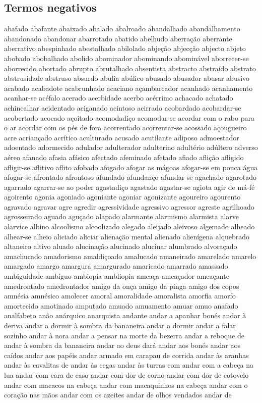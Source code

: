\subsection{Termos negativos}
abafado abafante abaixado abalado abalroado abandalhado abandalhamento abandonado abandonar abarrotado abatido abelhudo aberra\c{c}\~ao aberrante aberrativo abespinhado abestalhado abilolado abje\c{c}\~ao abjec\c{c}\~ao abjecto abjeto abobado abobalhado abolido abominador abominando abomin\'{a}vel aborrecer-se aborrecido abortado abrupto abrutalhado absentista abstracto abstra\'{i}do abstrato abstrusidade abstruso absurdo abulia ab\'{u}lico abusado abusador abusar abusivo acabado acabadote acabrunhado acaciano a\c{c}ambarcador acanhado acanhamento acanhar-se ac\'{e}falo acerado acerbidade acerbo ac\'{e}rrimo achacado achatado achincalhar acidentado aciganado acintoso acirrado acobardado acobardar-se acobertado acocado a\c{c}oitado acomodadi\c{c}o acomodar-se acordar com o rabo para o ar acordar com os p\'{e}s de fora acorrentado acorrentar-se acossado a\c{c}ougueiro acre acrian\c{c}ado acr\'{i}tico aculturado acusado acutilante adiposo admoestador adoentado adormecido adulador adulterador adulterino adult\'{e}rio ad\'{u}ltero adverso a\'{e}reo afanado afasia af\'{a}sico afectado afeminado afetado afiado afli\c{c}\~ao afligido afligir-se aflitivo aflito afobado afogado afogar as m\'{a}goas afogar-se em pouca \'{a}gua afogar-se afrontado afrontoso afundado afundan\c{c}o afundar-se agachado agarotado agarrado agarrar-se ao poder agastadi\c{c}o agastado agastar-se agiota agir de m\'{a}-f\'{e} agoirento agonia agoniado agoniante agoniar agonizante agoureiro agourento agravado agravar agre agredir agressividade agressivo agressor agreste agrilhoado agrosseirado aguado agu\c{c}ado alapado alarmante alarmismo alarmista alarve alarvice albino alcoolismo alcoolizado alegado aleijado aleivoso algemado alheado alhear-se alheio aliciado aliciar aliena\c{c}\~ao mental alienado alien\'{i}gena alquebrado altaneiro altivo aluado alucina\c{c}\~ao alucinado alucinar alumbrado alvora\c{c}ado amachucado amadorismo amaldi\c{c}oado amalucado amaneirado amarelado amarelo amargado amargo amargura amargurado amaricado amarrado amassado ambiguidade amb\'{i}guo ambiopia ambliopia amea\c{c}a amea\c{c}ador amea\c{c}ante amedrontado amedrontador amigo da on\c{c}a amigo da pinga amigo dos copos amn\'{e}sia amn\'{e}sico amolecer amoral amoralidade amoralista amorfia amorfo amortecido amotinado amputado amuado amuamento amuar amuo anafado analfabeto an\~ao an\'{a}rquico anarquista andante andar a apanhar bon\'{e}s andar \`{a} deriva andar a dormir \`{a} sombra da bananeira andar a dormir andar a falar sozinho andar \`{a} nora andar a pensar na morte da bezerra andar a reboque de andar \`{a} sombra da bananeira andar ao deus dar\'{a} andar aos bon\'{e}s andar aos ca\'{i}dos andar aos pap\'{e}is andar armado em carapau de corrida andar \`{a}s aranhas andar \`{a}s cavalitas de andar \`{a}s cegas andar \`{a}s turras com andar com a cabe\c{c}a na lua andar com cara de caso andar com dor de corno andar com dor de cotovelo andar com macacos na cabe\c{c}a andar com macaquinhos na cabe\c{c}a andar com o cora\c{c}\~ao nas m\~aos andar com os azeites andar de olhos vendados andar de 